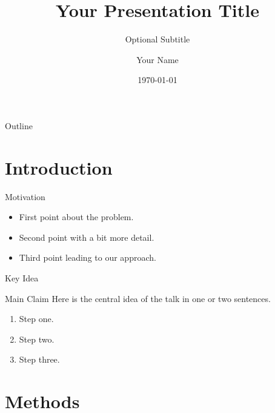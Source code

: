 \documentclass[aspectratio=169,11pt]{beamer}
\title{Your Presentation Title}
\subtitle{Optional Subtitle}
\author{Your Name}
\institute{Your Institution}
\date{\today}
\begin{document}
\begin{frame}[plain]
  \titlepage
\end{frame}

\begin{frame}{Outline}
  \tableofcontents
\end{frame}

\section{Introduction}

\begin{frame}{Motivation}
  \begin{itemize}
    \item First point about the problem.
    \item Second point with a bit more detail.
    \item Third point leading to our approach.
  \end{itemize}
\end{frame}

\begin{frame}{Key Idea}
  \begin{block}{Main Claim}
    Here is the central idea of the talk in one or two sentences.
  \end{block}
  \vspace{0.5em}
  \begin{enumerate}
    \item Step one.
    \item Step two.
    \item Step three.
  \end{enumerate}
\end{frame}

\section{Methods}
\end{document}
